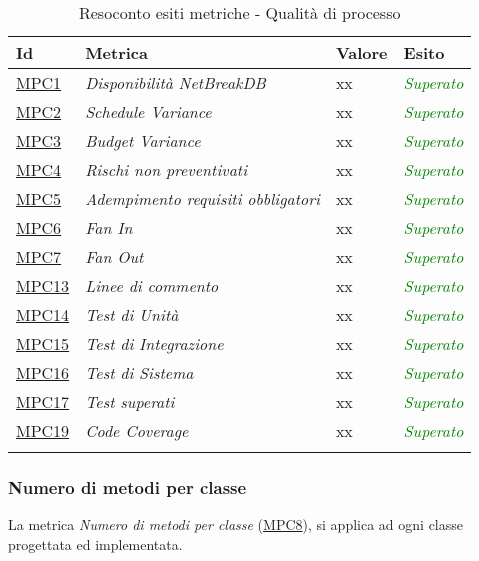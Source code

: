 		\begin{longtable}{|>{\centering\arraybackslash}p{2cm}|>{\centering\arraybackslash}p{5cm}|>{\centering\arraybackslash}p{3cm}|>{\centering\arraybackslash}p{3cm}|}
			\hline
			\rowcolor{Gray}
			\textbf{Id} & \textbf{Metrica} & \textbf{Valore} & \textbf{Esito} \\
			\hline
			\hyperlink{MPC1}{MPC1} & \textit{Disponibilità \textit{NetBreakDB}} & xx & \textcolor{Green}{\textit{Superato}}\\
			\hline
			\hyperlink{MPC2}{MPC2} & \textit{Schedule Variance} & xx & \textcolor{Green}{\textit{Superato}}\\
			\hline
			\hyperlink{MPC3}{MPC3} & \textit{Budget Variance} & xx & \textcolor{Green}{\textit{Superato}}\\
			\hline
			\hyperlink{MPC4}{MPC4} & \textit{Rischi non preventivati} & xx & \textcolor{Green}{\textit{Superato}}\\
			\hline
			\hyperlink{MPC5}{MPC5} & \textit{Adempimento requisiti obbligatori} & xx & \textcolor{Green}{\textit{Superato}}\\
			\hline
			\hyperlink{MPC6}{MPC6} & \textit{Fan In} & xx & \textcolor{Green}{\textit{Superato}}\\
			\hline
			\hyperlink{MPC7}{MPC7} & \textit{Fan Out} & xx & \textcolor{Green}{\textit{Superato}}\\
			\hline
			\hyperlink{MPC13}{MPC13} & \textit{Linee di commento} & xx & \textcolor{Green}{\textit{Superato}}\\
			\hline
			\hyperlink{MPC14}{MPC14} & \textit{Test di Unità} & xx & \textcolor{Green}{\textit{Superato}}\\
			\hline
			\hyperlink{MPC15}{MPC15} & \textit{Test di Integrazione} & xx & \textcolor{Green}{\textit{Superato}}\\
			\hline
			\hyperlink{MPC16}{MPC16} & \textit{Test di Sistema} & xx & \textcolor{Green}{\textit{Superato}}\\
			\hline
			\hyperlink{MPC17}{MPC17} & \textit{Test superati} & xx & \textcolor{Green}{\textit{Superato}}\\
			\hline
			\hyperlink{MPC19}{MPC19} & \textit{Code Coverage} & xx & \textcolor{Green}{\textit{Superato}}\\
			\hline
		
			\caption{Resoconto esiti metriche - Qualità di processo}
		\end{longtable}
	
\subsubsection{Numero di metodi per classe}
La metrica \textit{Numero di metodi per classe} (\hyperlink{MPC8}{MPC8}), si applica ad ogni classe progettata ed implementata.

